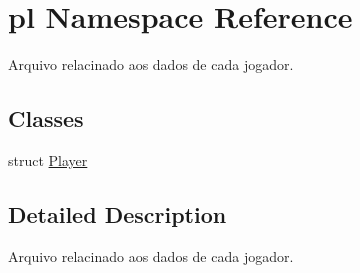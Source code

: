 \hypertarget{namespacepl}{}\section{pl Namespace Reference}
\label{namespacepl}


Arquivo relacinado aos dados de cada jogador.  


\subsection*{Classes}
\begin{DoxyCompactItemize}
\item 
struct \hyperlink{structpl_1_1Player}{Player}
\end{DoxyCompactItemize}


\subsection{Detailed Description}
Arquivo relacinado aos dados de cada jogador. 